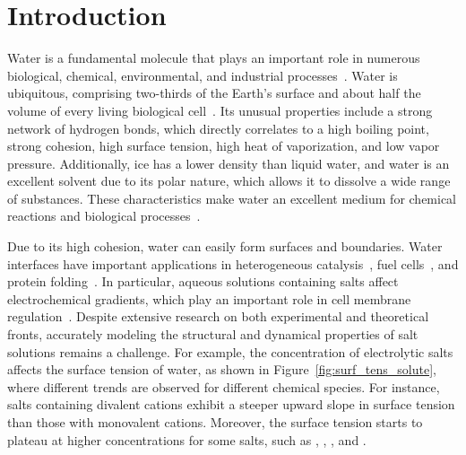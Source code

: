 \chapter{Introduction}

Water is a fundamental molecule that plays an important role in numerous biological, chemical, environmental, and industrial processes~\cite{henry2005state,Kurz2008,ahuja2013green}.
Water is ubiquitous, comprising two-thirds of the Earth's surface and about half the volume of every living biological cell~\cite{Kontogeorgis2022,ling2004determines}. Its unusual properties include a strong network of hydrogen bonds, which directly correlates to a high boiling point, strong cohesion, high surface tension, high heat of vaporization, and low vapor pressure. Additionally, ice has a lower density than liquid water, and water is an excellent solvent due to its polar nature, which allows it to dissolve a wide range of substances. These characteristics make water an excellent medium for chemical reactions and biological processes~\cite{Kontogeorgis2022,brini2017water}.

Due to its high cohesion, water can easily form surfaces and boundaries. Water interfaces have important applications in heterogeneous catalysis~\cite{fechete2012past}, fuel cells~\cite{Owejan2009}, and protein folding~\cite{levy2006water}. In particular, aqueous solutions containing salts affect electrochemical gradients, which play an important role in cell membrane regulation~\cite{lai2006distribution}. Despite extensive research on both experimental and theoretical fronts, accurately modeling the structural and dynamical properties of salt solutions remains a challenge. For example, the concentration of electrolytic salts affects the surface tension of water, as shown in Figure~\ref{fig:surf_tens_solute}, where different trends are observed for different chemical species. For instance, salts containing divalent cations exhibit a steeper upward slope in surface tension than those with monovalent cations. Moreover, the surface tension starts to plateau at higher concentrations for some salts, such as , , , and .

